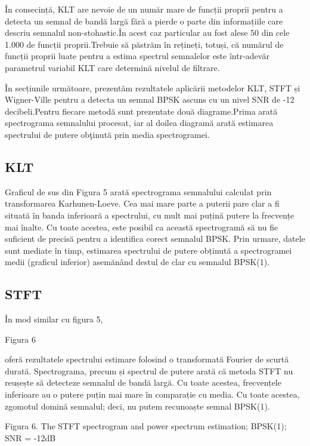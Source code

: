 \documentclass[12pt]{report}
\begin{document}
În consecință, KLT are nevoie de un număr mare de funcții proprii pentru a detecta un semnal de bandă largă fără a pierde o parte din informațiile care descriu semnalul non-stohastic.\@ În acest caz particular au fost alese 50 din cele 1.000 de funcții proprii.\@ Trebuie să păstrăm în rețineți, totuși, că numărul de funcții proprii luate pentru a estima spectrul semnalelor este într-adevăr parametrul variabil KLT care determină nivelul de filtrare.

În secțiunile următoare, prezentăm rezultatele aplicării metodelor KLT, STFT și Wigner-Ville pentru a detecta un semnal BPSK ascuns cu un nivel SNR de -12 decibeli.\@ Pentru fiecare metodă sunt prezentate două diagrame.\@ Prima arată spectrograma semnalului procesat, iar al doilea diagramă arată estimarea spectrului de putere obţinută prin media spectrogramei.

\subsection*{KLT}

Graficul de sus din Figura 5 arată spectrograma semnalului calculat prin transformarea Karhunen-Loeve. Cea mai mare parte a puterii pare clar a fi situată în banda inferioară a spectrului, cu mult mai puțină putere la frecvențe mai înalte. Cu toate acestea, este posibil ca această spectrogramă să nu fie suficient de precisă pentru a identifica corect semnalul BPSK. Prin urmare, datele sunt mediate în timp, estimarea spectrului de putere obținută a spectrogramei medii (graficul inferior) asemănând destul de clar cu semnalul BPSK(1).

\subsection*{STFT}

În mod similar cu figura 5, \begin{normalsize}\color{red}Figura 6\end{normalsize} oferă rezultatele spectrului
estimare folosind o transformată Fourier de scurtă durată. Spectrograma, precum și spectrul de putere arată că metoda STFT nu reușește să detecteze semnalul de bandă largă.
Cu toate acestea, frecvențele inferioare au o putere puțin mai mare în comparație cu media. Cu toate acestea, zgomotul domină semnalul; deci, nu putem recunoaște
semnal BPSK(1).
\begin{center}
	\color{blue}Figura 6. The STFT spectrogram and power spectrum estimation; BPSK(1); SNR = -12dB
\end{center}
\end{document}
